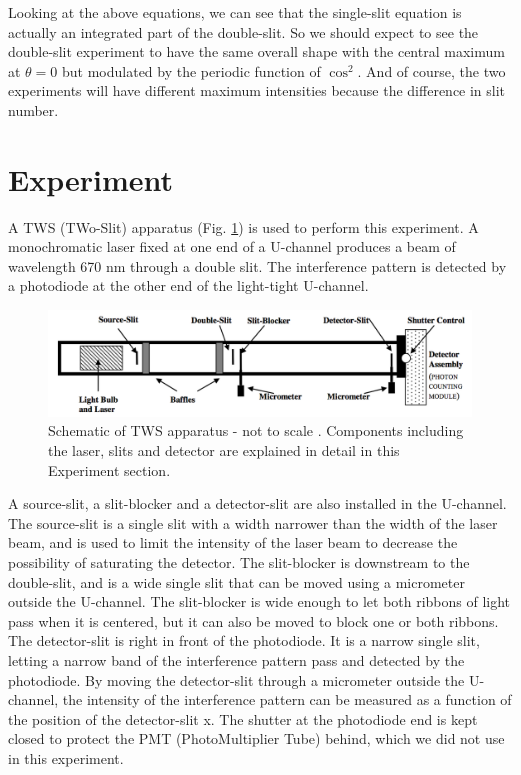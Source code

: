 \documentclass[prb,preprint]{revtex4-1}
\begin{document}
Looking at the above equations, we can see that the single-slit equation is actually an integrated part of the double-slit. So we should expect to see the double-slit experiment to have the same overall shape with the central maximum at $\theta=0$ but modulated by the periodic function of $\cos ^2$. And of course, the two experiments will have different maximum intensities because the difference in slit number.

\section{Experiment}

A TWS (TWo-Slit) apparatus (Fig. \ref{dia}) is used to perform this experiment. A monochromatic laser fixed at one end of a U-channel produces a beam of wavelength 670 nm through a double slit.  The interference pattern is detected by a photodiode at the other end of the light-tight U-channel. \\

\begin{figure}[h!]
\centering
\includegraphics[width=7in]{dia}
\caption{Schematic of TWS apparatus - not to scale \cite{dia}. Components including the laser, slits and detector are explained in detail in this Experiment section.}
\label{dia}
\end{figure}

A source-slit, a slit-blocker and a detector-slit are also installed in the U-channel. The source-slit is a single slit with a width narrower than the width of the laser beam, and is used to limit the intensity of the laser beam to decrease the possibility of saturating the detector. The slit-blocker is downstream to the double-slit, and is a wide single slit that can be moved using a micrometer outside the U-channel. The slit-blocker is wide enough to let both ribbons of light pass when it is centered, but it can also be moved to block one or both ribbons. The detector-slit is right in front of the photodiode. It is a narrow single slit, letting a narrow band of the interference pattern pass and detected by the photodiode. By moving the detector-slit through a micrometer outside the U-channel, the intensity of the interference pattern can be measured as a function of the position of the detector-slit x. The shutter at the photodiode end is kept closed to protect the PMT (PhotoMultiplier Tube) behind, which we did not use in this experiment. \\
\end{document}
